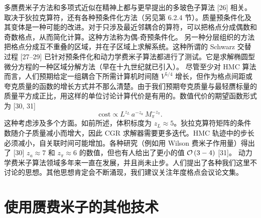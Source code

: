 多赝费米子方法和多项式近似在精神上都与更早提出的多玻色子算法 [26] 相关。取决于狄拉克算符，还有各种预条件化方法（另见第 6.2.4 节）。质量预条件化及其变体是一种可能的改进。对于只涉及最近邻耦合的算符，可以把格点分成偶数和奇数格点，从而简化计算。这种方法称为偶-奇预条件化。
另一种分层组织的方法把格点分成互不重叠的区域，并在子区域上求解系统。这种所谓的 Schwarz 交替过程 [27--29] 已针对预条件化和动力学费米子算法都进行了测试。它是求解椭圆型微分方程的一种区域分解方法（早在十九世纪就已引入）。
尽管至少对 HMC 算法而言，人们预期给定一组耦合下所需计算机时间随 $V^{5/4}$ 增长，但作为格点间距或夸克质量的函数的增长方式并不那么清楚。由于我们预期夸克质量与最轻赝标量的质量平方成正比，用这样的单位讨论计算代价是有用的。数值代价的期望函数形式为 [30, 31]
\begin{equation}
\mathrm{cost} \propto L^{z_L}\,a^{-z_a}\,M_\pi^{-z_\pi}.
\end{equation}
这种考虑涉及多个方面。如前所述，体积标度为 $z_L \approx 5$。狄拉克算符矩阵的条件数随介子质量减小而增大，因此 CGR 求解器需要更多迭代。HMC 轨迹中的步长必须减小，自关联时间可能增加。各种研究（例如用 Wilson 费米子作用量）得出了 [30] $z_a \approx 7$ 和 $z_\pi \approx 6$ 的数值，但也有人给出了更小的值 $\mathcal{O}\left(3-4\right)$ [31]。
动力学费米子算法领域多年来一直在发展，并且尚未止步。人们提出了各种我们这里不讨论的思想。其他思想肯定会不断涌现，我们建议关注年度格点会议论文集。

\section{使用赝费米子的其他技术}


